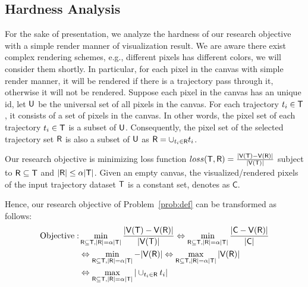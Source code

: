 


\subsection{Hardness Analysis}\label{sec:hard}
For the sake of presentation, we analyze the hardness of our research objective with a simple render manner of visualization result.
We are aware there exist complex rendering schemes, e.g., different pixels has different colors, we will consider them shortly.
In particular, for each pixel in the canvas with simple render manner, it will be rendered if there is a trajectory pass through it, otherwise it will not be rendered.
Suppose each pixel in the canvas has an unique id, let $\mathsf{U}$ be the universal set of all pixels in the canvas.
For each trajectory $t_i \in \mathsf{T}$, it consists of a set of pixels in the canvas.
In other words, the pixel set of each trajectory $t_i \in \mathsf{T}$ is a subset of $\mathsf{U}$.
Consequently, the pixel set of the selected trajectory set $\mathsf{R}$ is also a subset of $\mathsf{U}$ as $\mathsf{R} = \cup_{t_i \in \mathsf{R}} t_i$.


Our research objective is minimizing loss function $loss(\mathsf{T}, \mathsf{R}) =  \frac{|\mathsf{V}(\mathsf{T}) - \mathsf{V}(\mathsf{R})|}{|\mathsf{V}(\mathsf{T})|}$ subject to $\mathsf{R} \subseteq \mathsf{T}$ and $|\mathsf{R}| \leq \alpha |\mathsf{T}|$.
Given an empty canvas, the visualized/rendered pixels of the input trajectory dataset $\mathsf{T}$ is a constant set, denotes as $\mathsf{C}$.

Hence, our research objective of Problem~\ref{prob:def} can be transformed as follows:
\begin{align}\label{eqn:obj2} \nonumber
\text{Objective}: & \min_{\oR \subseteq \D, |\oR| = \alpha |\D|}  \frac{|\V(\D) - \V(\oR)|}{|\V(\D)|} \Leftrightarrow \min_{\oR \subseteq \D, |\oR| = \alpha |\D|}  \frac{|\mathsf{C} - \V(\oR)|}{|\mathsf{C}|}  \\ \nonumber %
& \Leftrightarrow \min_{\oR \subseteq \D, |\oR| = \alpha |\D|}   - |\V(\oR)| \Leftrightarrow \max_{\oR \subseteq \D, |\oR| = \alpha |\D|}  |\V(\oR)|  \\ \nonumber
& \Leftrightarrow \max_{\oR \subseteq \D, |\oR| = \alpha |\D|} | \cup_{t_i \in \oR} t_i |
\end{align}


